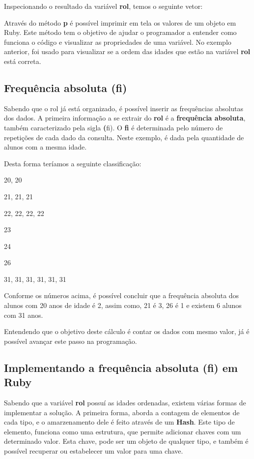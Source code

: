 \documentclass[12pt]{article}
\newcommand{\code}[1] {\textbf{#1}}
\begin{document}
Inspecionando o resultado da variável \code{rol}, temos o seguinte vetor:

 

Através do método \code{p} é possível imprimir em tela os valores de um objeto em Ruby. Este método tem o objetivo de ajudar o programador a entender como funciona o código e visualizar as propriedades de uma variável. No exemplo anterior, foi usado para visualizar se a ordem das idades que estão na variável \code{rol} está correta.


\subsection { Frequência absoluta (fi) }

Sabendo que o rol já está organizado, é possível inserir  as frequências absolutas dos dados. A primeira informação a se extrair do \code{rol} é a \code{frequência absoluta}, também caracterizado pela sigla \code(fi). O \code{fi} é determinada pelo número de repetições de cada dado da consulta. Neste exemplo, é dada pela quantidade de alunos com a mesma idade.

Desta forma teríamos a seguinte classificação:

20, 20

21, 21, 21

22, 22, 22, 22

23

24

26

31, 31, 31, 31, 31, 31


Conforme os números acima, é possível concluir que a frequência absoluta dos alunos com 20 anos de idade é 2, assim como, 21 é 3, 26 é 1 e existem 6 alunos com 31 anos.

Entendendo que o objetivo deste cálculo é contar os dados com mesmo valor, já é possível avançar este passo na programação.

\subsection { Implementando a frequência absoluta (fi) em Ruby }

Sabendo que a variável \code{rol} possuí as idades ordenadas, existem várias formas de implementar a solução. A primeira forma, aborda a contagem de elementos de cada tipo, e o amarzenamento dele é feito através de um \code{Hash}. Este tipo de elemento, funciona como uma estrutura, que permite adicionar chaves com um determinado valor. Esta chave, pode ser um objeto de qualquer tipo, e também é possível recuperar ou estabelecer um valor para uma chave.
\end{document}
